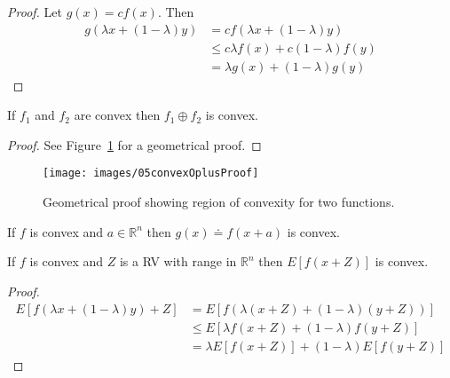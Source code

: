 \begin{proof}
Let $g(x)=cf(x)$.
Then
\begin{align*}
g(\lambda x+(1-\lambda)y) &= cf(\lambda x+(1-\lambda)y) \\
&\leq c\lambda f(x) + c(1-\lambda)f(y) \\
&= \lambda g(x) + (1-\lambda)g(y)
\end{align*}
\end{proof}

\begin{theorem}%
\label{th:maxconvex}
If $f_1$ and $f_2$ are convex then $f_1\oplus f_2$ is convex.
\end{theorem}

\begin{proof}
See Figure~\ref{fig:05convexOplusProof} for a geometrical proof.
\end{proof}

\begin{figure}[ht!]
\centering
\texttt{[image: images/05convexOplusProof]}
\caption{Geometrical proof showing region of convexity for two functions.}%
\label{fig:05convexOplusProof}
\end{figure}

\begin{theorem}%
\label{th:argconvex}
If $f$ is convex and $a\in\mathbb{R}^n$ then $g(x)\doteq f(x+a)$ is convex.
\end{theorem}

\begin{theorem}%
\label{th:randconvex}
If $f$ is convex and $Z$ is a RV with range in $\mathbb{R}^n$ then $E[f(x+Z)]$ is convex.
\end{theorem}

\begin{proof}
\begin{align*}
E[f(\lambda x+(1-\lambda)y) + Z] &= E[f(\lambda(x+Z) + (1-\lambda)(y+Z))] \\
&\leq E[\lambda f(x+Z) + (1-\lambda)f(y+Z)] \\
&= \lambda E[f(x+Z)] + (1-\lambda)E[f(y+Z)]
\end{align*}
\end{proof}

